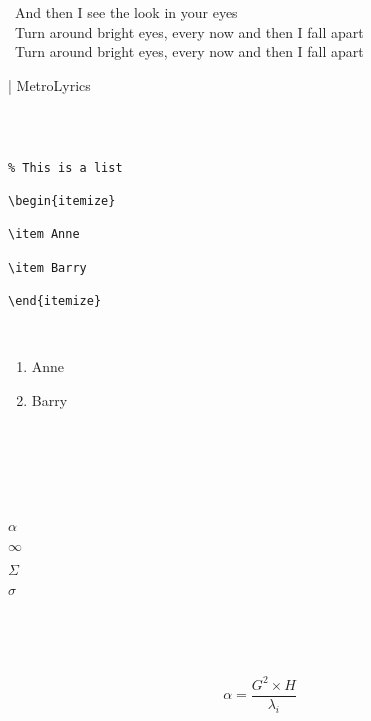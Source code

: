 \documentclass[12pt,a4paper]{article}
\begin{document}
 And then I see the
look in your eyes \\

 Turn around bright
eyes, every now and then I fall apart \\

 Turn around bright
eyes, every now and then I fall apart \\

\newpage

| MetroLyrics

 

\begin{framed}

\begin{verbatim}

% This is a list

\begin{itemize}

\item Anne

\item Barry

\end{itemize}

\end{verbatim}

\end{framed}

 


\begin{enumerate}

\item Anne

\item Barry

\end{enumerate}

 


 

\newpage

 

$\alpha$

$\infty$

$\Sigma$

$\sigma$


 

 

\begin{equation}

 \alpha = \frac{ G^2
\times H }{ \lambda_i } 

\end{equation}

 
\end{document}
